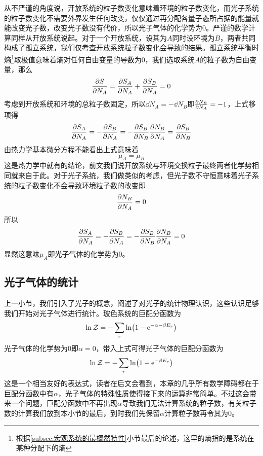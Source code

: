\documentclass[../../main.tex]{subfiles}
\begin{document}
从不严谨的角度说，开放系统的粒子数变化意味着环境的粒子数变化，而光子系统的粒子数变化不需要外界发生任何改变，仅仅通过再分配各量子态所占据的能量就能改变光子数，改变光子数没有代价，所以光子气体的化学势为0。严谨的数学计算同样从开放系统说起。对于一个开放系统，设其为\(A\)同时设环境为\(B\)，两者共同构成了孤立系统，我们仅考查开放系统粒子数变化会导致的结果。孤立系统平衡时熵\footnote{根据\ref{subsec:宏观系统的最概然特性}小节最后的论述，这里的熵指的是系统在某种分配下的熵}取极值意味着熵对任何自由变量的导数为0，我们选取系统\(A\)的粒子数为自由变量，那么\begin{equation}
    \pdv{S}{N_A}=\pdv{S_A}{N_A}+\pdv{S_B}{N_A}=0
\end{equation}
考虑到开放系统和环境的总粒子数固定，所以\(\dd N_A=-\dd N_B\)即\(\pdv{N_B}{N_A}=-1\)，上式移项得
\begin{equation}
    \pdv{S_A}{N_A}=-\pdv{S_B}{N_A}=-\pdv{S_B}{N_B}\pdv{N_B}{N_A}=\pdv{S_B}{N_B}
\end{equation}
由热力学基本微分方程不能看出上式意味着
\begin{equation}
    \mu_A=\mu_B
\end{equation}
这是热力学中就有的结论，前文我们说开放系统与环境交换粒子最终两者化学势相同就来自于此。对于光子系统，我们做类似的考虑，但光子数不守恒意味着光子系统的粒子数变化不会导致环境粒子数的改变即
\begin{equation}
    \pdv{N_B}{N_A}=0
\end{equation}
所以
\begin{equation}
    \pdv{S_A}{N_A}=-\pdv{S_B}{N_A}=-\pdv{S_B}{N_B}\pdv{N_B}{N_A}=0
\end{equation}
显然这意味\(\mu_A\)即光子气体的化学势为0。

\subsection{光子气体的统计}
上一小节，我们引入了光子的概念，阐述了对光子的统计物理认识，这些认识足够我们开始对光子气体进行统计。玻色系统的巨配分函数为
\begin{equation}
    \ln\mathcal{Z}=-\sum_r \ln(1-\mathrm{e}^{-\alpha-\beta E_r})
\end{equation}
光子气体的化学势为0即\(\alpha=0\)，带入上式可得光子气体的巨配分函数为
\begin{equation}
    \ln\mathcal{Z}=-\sum_r \ln(1-\mathrm{e}^{-\beta E_r})
\end{equation}
这是一个相当友好的表达式，读者在后文会看到，本章的几乎所有数学障碍都在于巨配分函数中有\(\alpha\)，光子气体的特殊性质使得接下来的运算非常简单。不过这会带来一个问题，巨配分函数中不再出现\(\alpha\)导致我们无法计算系统的粒子数，有关粒子数的计算我们放到本小节的最后，到时我们先保留\(\alpha\)计算粒子数再令其为0。
\end{document}

